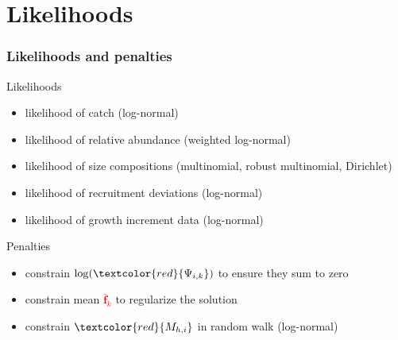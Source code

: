\documentclass{beamer}
\begin{document}

\section{Likelihoods}


\begin{frame}
\frametitle{Likelihoods and penalties}
Likelihoods
\begin{itemize}
\item likelihood of catch (log-normal)
\item likelihood of relative abundance (weighted log-normal)
\item likelihood of size compositions (multinomial, robust multinomial, Dirichlet)
\item likelihood of recruitment deviations (log-normal)
\item likelihood of growth increment data (log-normal)
\end{itemize}
Penalties
\begin{itemize}
\item constrain $\log (\textcolor{red}{\Psi_{i,k}})$ to ensure they sum to zero
\item constrain mean \textcolor{red}{$\bar{\boldsymbol{f}}_k$} to regularize the
  solution
\item constrain $\textcolor{red}{M_{h,i}}$ in random walk (log-normal)
\end{itemize}

\end{frame}

\end{document}
